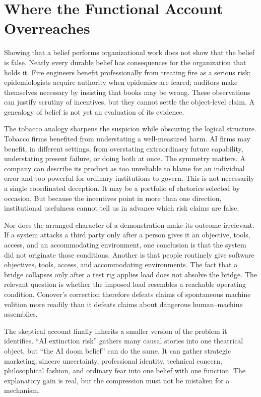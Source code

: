 \documentclass[11pt]{article}
\theoremstyle{definition}
\begin{document}
\section{Where the Functional Account Overreaches}

Showing that a belief performs organizational work does not show that the belief is false. Nearly every durable belief has consequences for the organization that holds it. Fire engineers benefit professionally from treating fire as a serious risk; epidemiologists acquire authority when epidemics are feared; auditors make themselves necessary by insisting that books may be wrong. These observations can justify scrutiny of incentives, but they cannot settle the object-level claim. A genealogy of belief is not yet an evaluation of its evidence.

The tobacco analogy sharpens the suspicion while obscuring the logical structure. Tobacco firms benefited from understating a well-measured harm. AI firms may benefit, in different settings, from overstating extraordinary future capability, understating present failure, or doing both at once. The symmetry matters. A company can describe its product as too unreliable to blame for an individual error and too powerful for ordinary institutions to govern. This is not necessarily a single coordinated deception. It may be a portfolio of rhetorics selected by occasion. But because the incentives point in more than one direction, institutional usefulness cannot tell us in advance which risk claims are false.

Nor does the arranged character of a demonstration make its outcome irrelevant. If a system attacks a third party only after a person gives it an objective, tools, access, and an accommodating environment, one conclusion is that the system did not originate those conditions. Another is that people routinely give software objectives, tools, access, and accommodating environments. The fact that a bridge collapses only after a test rig applies load does not absolve the bridge. The relevant question is whether the imposed load resembles a reachable operating condition. Conover's correction therefore defeats claims of spontaneous machine volition more readily than it defeats claims about dangerous human--machine assemblies.

The skeptical account finally inherits a smaller version of the problem it identifies. ``AI extinction risk'' gathers many causal stories into one theatrical object, but ``the AI doom belief'' can do the same. It can gather strategic marketing, sincere uncertainty, professional identity, technical concern, philosophical fashion, and ordinary fear into one belief with one function. The explanatory gain is real, but the compression must not be mistaken for a mechanism.
\end{document}
